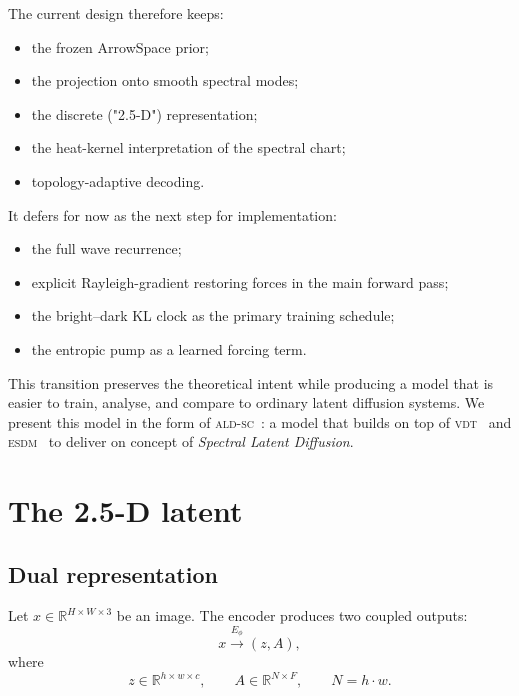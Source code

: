 \documentclass[11pt]{article}
\newcommand{\ESDM}{\textsc{esdm}}
\newcommand{\ALDSC}{\textsc{ald-sc}}
\newcommand{\VDT}{\textsc{vdt}}
\newcommand{\R}{\mathbb{R}}
\begin{document}
The current design therefore keeps:

\begin{itemize}[leftmargin=1.5em]
\item the frozen ArrowSpace prior;
\item the projection onto smooth spectral modes;
\item the discrete ("2.5-D") representation;
\item the heat-kernel interpretation of the spectral chart;
\item topology-adaptive decoding.
\end{itemize}

It defers for now as the next step for implementation:

\begin{itemize}[leftmargin=1.5em]
\item the full wave recurrence;
\item explicit Rayleigh-gradient restoring forces in the main forward pass;
\item the bright--dark KL clock as the primary training schedule;
\item the entropic pump as a learned forcing term.
\end{itemize}

This transition preserves the theoretical intent while producing a model that
is easier to train, analyse, and compare to ordinary latent diffusion systems. We present this model in the form of \ALDSC~\cite{Moriondo2026ALDSC_code}: a model that builds on top of \VDT~\cite{Moriondo2026VDT} and \ESDM~\cite{Moriondo2026ESDM_code} to deliver on concept of \emph{Spectral Latent Diffusion}. 

\section{The 2.5-D latent}
\label{sec:25d}

\subsection{Dual representation}
\label{sec:dual_representation}

Let $x \in \R^{H \times W \times 3}$ be an image. The encoder produces two
coupled outputs:
\[x \xrightarrow{E_\phi} (z, A),\]
where
\[z \in \R^{h \times w \times c}, \qquad A \in \R^{N \times F}, \qquad N = h \cdot w.\]
\end{document}
